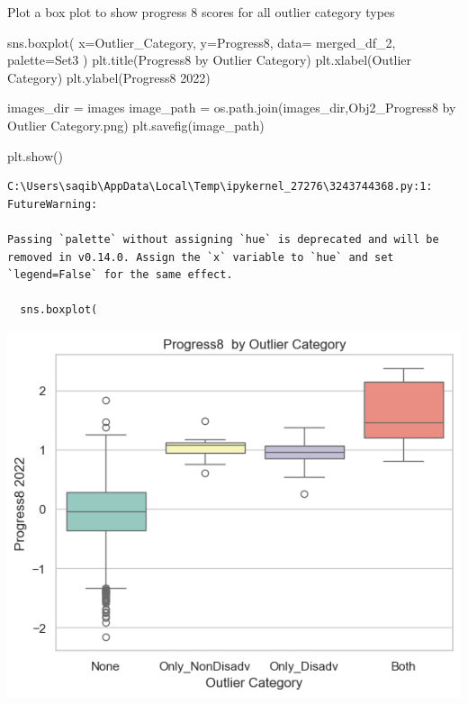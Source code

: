 \documentclass[
  letterpaper,
  DIV=11,
  numbers=noendperiod]{scrartcl}
\newenvironment{Shaded}{\begin{snugshade}}{\end{snugshade}}
\newcommand{\NormalTok}[1]{\textcolor[rgb]{0.00,0.23,0.31}{#1}}
\newcommand{\OperatorTok}[1]{\textcolor[rgb]{0.37,0.37,0.37}{#1}}
\newcommand{\StringTok}[1]{\textcolor[rgb]{0.13,0.47,0.30}{#1}}
\begin{document}
Plot a box plot to show progress 8 scores for all outlier category types

\begin{Shaded}
\begin{Highlighting}[]
\NormalTok{sns.boxplot(}
\NormalTok{    x}\OperatorTok{=}\StringTok{\textquotesingle{}Outlier\_Category\textquotesingle{}}\NormalTok{, }
\NormalTok{    y}\OperatorTok{=}\StringTok{\textquotesingle{}Progress8\textquotesingle{}}\NormalTok{, }
\NormalTok{    data}\OperatorTok{=}\NormalTok{ merged\_df\_2,  }
\NormalTok{    palette}\OperatorTok{=}\StringTok{\textquotesingle{}Set3\textquotesingle{}}
\NormalTok{)}
\NormalTok{plt.title(}\StringTok{\textquotesingle{}Progress8  by Outlier Category\textquotesingle{}}\NormalTok{)}
\NormalTok{plt.xlabel(}\StringTok{\textquotesingle{}Outlier Category\textquotesingle{}}\NormalTok{)}
\NormalTok{plt.ylabel(}\StringTok{\textquotesingle{}Progress8 2022\textquotesingle{}}\NormalTok{)}


\NormalTok{images\_dir }\OperatorTok{=} \StringTok{\textquotesingle{}images\textquotesingle{}}
\NormalTok{image\_path }\OperatorTok{=}\NormalTok{ os.path.join(images\_dir,}\StringTok{\textquotesingle{}Obj2\_Progress8 by Outlier Category.png\textquotesingle{}}\NormalTok{)}
\NormalTok{plt.savefig(image\_path)}

\NormalTok{plt.show()}
\end{Highlighting}
\end{Shaded}

\begin{verbatim}
C:\Users\saqib\AppData\Local\Temp\ipykernel_27276\3243744368.py:1: FutureWarning: 

Passing `palette` without assigning `hue` is deprecated and will be removed in v0.14.0. Assign the `x` variable to `hue` and set `legend=False` for the same effect.

  sns.boxplot(
\end{verbatim}

\includegraphics{P4DS_A2_Data_Analysis_Project_files/figure-pdf/cell-83-output-2.png}
\end{document}
